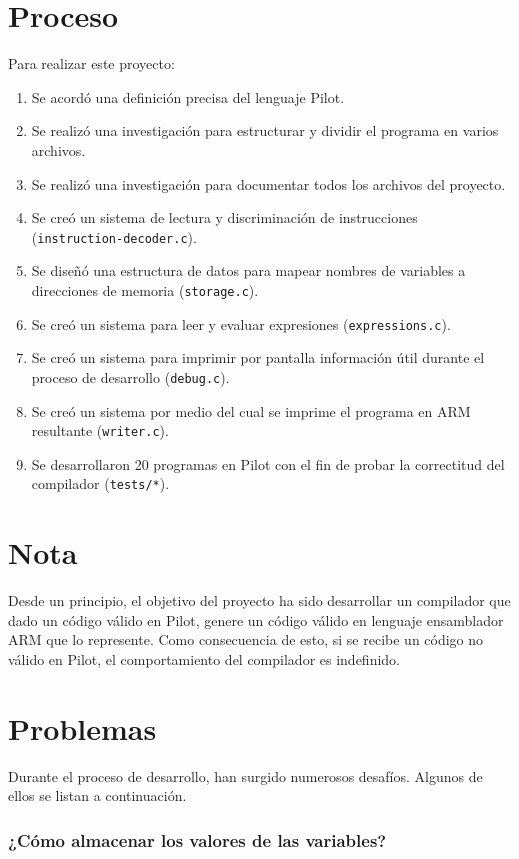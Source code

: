 \documentclass[12pt,spanish]{article}
\begin{document}
\section{Proceso}
Para realizar este proyecto:
\begin{enumerate}
\item{Se acordó una definición precisa del lenguaje Pilot.}
\item{Se realizó una investigación para estructurar y dividir el programa en varios archivos.}
\item{Se realizó una investigación para documentar todos los archivos del proyecto.}
\item{Se creó un sistema de lectura y discriminación de instrucciones (\texttt{instruction-decoder.c}).}
\item{Se diseñó una estructura de datos para mapear nombres de variables a direcciones de memoria (\texttt{storage.c}).}
\item{Se creó un sistema para leer y evaluar expresiones (\texttt{expressions.c}).}
\item{Se creó un sistema para imprimir por pantalla información útil durante el proceso de desarrollo (\texttt{debug.c}).}
\item{Se creó un sistema por medio del cual se imprime el programa en ARM resultante (\texttt{writer.c}).}
\item{Se desarrollaron 20 programas en Pilot con el fin de probar la correctitud del compilador (\texttt{tests/*}).}
\end{enumerate}

\section{Nota}
Desde un principio, el objetivo del proyecto ha sido desarrollar un compilador que dado un código válido en Pilot, genere un código válido en lenguaje ensamblador ARM que lo represente. Como consecuencia de esto, si se recibe un código no válido en Pilot, el comportamiento del compilador es indefinido.

\section{Problemas}
Durante el proceso de desarrollo, han surgido numerosos desafíos. Algunos de ellos se listan a continuación.
\subsubsection{¿Cómo almacenar los valores de las variables?}
\end{document}
